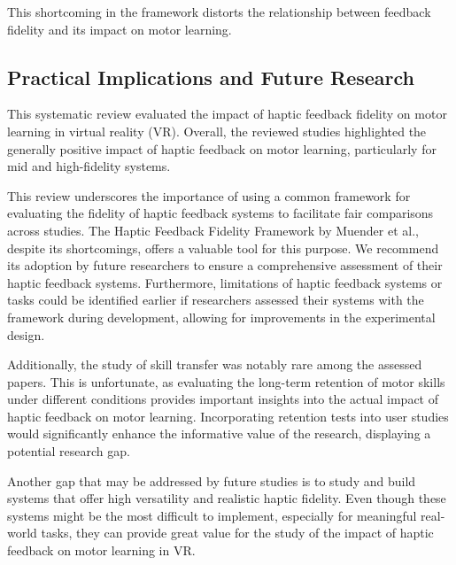 This shortcoming in the framework distorts the relationship between feedback fidelity and its impact on motor learning.

\subsection{Practical Implications and Future Research}
This systematic review evaluated the impact of haptic feedback fidelity on motor learning in virtual reality (VR). Overall, the reviewed studies highlighted the generally positive impact of haptic feedback on motor learning, particularly for mid and high-fidelity systems.

This review underscores the importance of using a common framework for evaluating the fidelity of haptic feedback systems to facilitate fair comparisons across studies. The Haptic Feedback Fidelity Framework by Muender et al., despite its shortcomings, offers a valuable tool for this purpose. We recommend its adoption by future researchers to ensure a comprehensive assessment of their haptic feedback systems. Furthermore, limitations of haptic feedback systems or tasks could be identified earlier if researchers assessed their systems with the framework during development, allowing for improvements in the experimental design.

Additionally, the study of skill transfer was notably rare among the assessed papers. This is unfortunate, as evaluating the long-term retention of motor skills under different conditions provides important insights into the actual impact of haptic feedback on motor learning. Incorporating retention tests into user studies would significantly enhance the informative value of the research, displaying a potential research gap.

Another gap that may be addressed by future studies is to study and build systems that offer high versatility and realistic haptic fidelity. Even though these systems might be the most difficult to implement, especially for meaningful real-world tasks, they can provide great value for the study of the impact of haptic feedback on motor learning in VR. 
